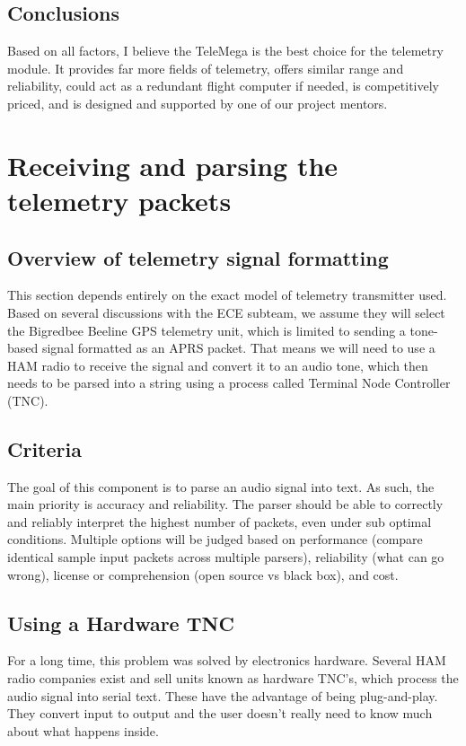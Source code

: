 \documentclass[onecolumn, draftclsnofoot, 10pt, compsoc]{IEEEtran}
\begin{document}
\subsection{Conclusions}
Based on all factors, I believe the TeleMega is the best choice for the telemetry module.  It provides far more fields of telemetry, offers similar range and reliability, could act as a redundant flight computer if needed, is competitively priced, and is designed and supported by one of our project mentors.


\section{Receiving and parsing the telemetry packets}

\subsection{Overview of telemetry signal formatting}
This section depends entirely on the exact model of telemetry transmitter used.  Based on several discussions with the ECE subteam, we assume they will select the Bigredbee Beeline GPS telemetry unit, which is limited to sending a tone-based signal formatted as an APRS packet.  That means we will need to use a HAM radio to receive the signal and convert it to an audio tone, which then needs to be parsed into a string using a process called Terminal Node Controller (TNC).

\subsection{Criteria}
The goal of this component is to parse an audio signal into text.  As such, the main priority is accuracy and reliability.  The parser should be able to correctly and reliably interpret the highest number of packets, even under sub optimal conditions.  Multiple options will be judged based on performance (compare identical sample input packets across multiple parsers), reliability (what can go wrong), license or comprehension (open source vs black box), and cost.

\subsection{Using a Hardware TNC}
For a long time, this problem was solved by electronics hardware.  Several HAM radio companies exist and sell units known as hardware TNC's, which process the audio signal into serial text.  These have the advantage of being plug-and-play.  They convert input to output and the user doesn't really need to know much about what happens inside.
\end{document}
